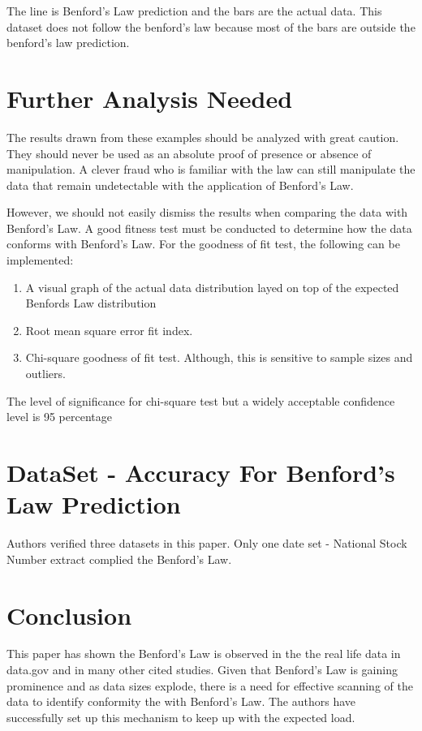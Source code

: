 The line is Benford’s Law prediction and the bars are 
the actual data. This dataset does not follow the benford's law
because most of the bars are outside the benford's law prediction.


\section{Further Analysis Needed}
The results drawn from these examples should 
be analyzed with great caution. They should 
never be used as an absolute proof of presence 
or absence of manipulation. A clever fraud who 
is familiar with the law can still manipulate 
the data that remain undetectable with the 
application of Benford’s Law.

However, we should not easily dismiss the results 
when comparing the data with Benford’s Law. 
A good fitness test must be conducted to determine 
how the data conforms with Benford’s Law.
For the goodness of fit test, the following can be implemented:

\begin{enumerate}
\item A visual graph of the actual data distribution 
layed on top of the expected Benfords Law distribution
\item Root mean square error fit index.
\item Chi-square goodness of fit test. Although, 
this is sensitive to sample sizes and outliers.
\end{enumerate}

The level of significance for chi-square test 
but a widely acceptable confidence level is 95 percentage

\section{DataSet - Accuracy For Benford's Law Prediction}
Authors verified three datasets in this paper. Only one
date set - National Stock Number extract 
complied the Benford's Law.

\section{Conclusion}
This paper has shown the Benford’s Law is observed in 
the the real life data in data.gov and in many other 
cited studies. Given that Benford’s Law is gaining prominence 
and as data sizes explode, there is a need for effective scanning
of the data to identify conformity the with Benford’s Law. 
The authors have successfully set up this mechanism to 
keep up with the expected load.



